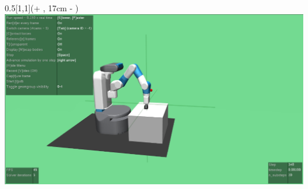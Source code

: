 \begin{frame}
	\begin{textblock*}{0.5\paperwidth}[1,1](\textwidth + \PraesentationSeitenrand, 17cm - \PraesentationSeitenrand)%
		\includegraphics[width=0.3\paperwidth]{./Ressourcen/Figures/FetchPickAndPlace-v1.pdf}
	\end{textblock*}
	
	
	
\end{frame}
\clearpage





